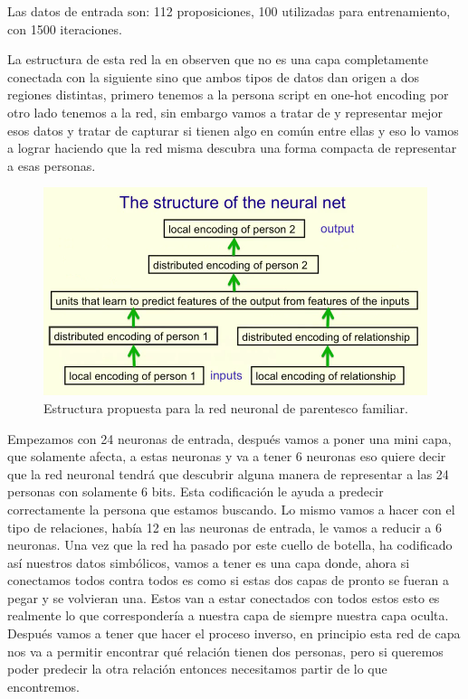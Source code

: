 Las datos de entrada son: 112 proposiciones, 100 utilizadas para entrenamiento, con 1500 iteraciones.

 La estructura de esta red la  en observen que no es una capa completamente conectada con la siguiente sino que ambos tipos de datos dan origen a dos regiones distintas, primero tenemos a la persona script en one-hot encoding por otro lado tenemos a la red, sin embargo vamos a tratar de y representar mejor esos datos y tratar de capturar si tienen algo en común entre ellas y eso lo vamos a lograr haciendo que la red misma descubra una forma compacta de representar a esas personas. 

 
  \begin{figure}[h]
   \centering
   \includegraphics[scale=.5]{../Figuras/Hinton/RedHinton86.png}
   \caption{Estructura propuesta para la red neuronal de parentesco familiar.}
  \label{fig:RH86}
  \end{figure}

   Empezamos con 24 neuronas de entrada, después vamos a poner una mini capa, que solamente afecta, a estas neuronas y va a tener 6 neuronas eso quiere decir que la red neuronal tendrá que descubrir alguna manera de representar a las 24 personas con solamente 6 bits. Esta codificación le ayuda a predecir correctamente la persona que estamos buscando. Lo mismo vamos a hacer con el tipo de relaciones, había 12 en las neuronas de entrada, le vamos a reducir a 6 neuronas. Una vez que la red ha pasado por este cuello de botella, ha codificado así nuestros datos simbólicos, vamos a tener es una capa donde, ahora si conectamos todos contra todos es como si estas dos capas de pronto se fueran a pegar y se volvieran una. Estos van a estar conectados con todos estos esto es realmente lo que correspondería a nuestra capa de siempre nuestra capa oculta. Después vamos a tener que hacer el proceso inverso, en principio esta red de capa nos va a permitir encontrar  qué relación tienen dos personas, pero si queremos poder predecir la otra relación entonces necesitamos partir de lo que encontremos.
 
